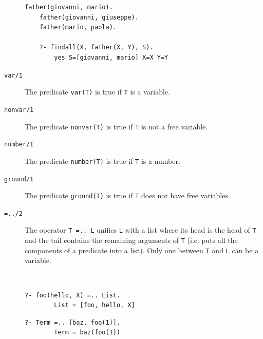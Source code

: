 \begin{description}
        \begin{example} \phantom{}
                \begin{lstlisting}[language={}]
    father(giovanni, mario).
    father(giovanni, giuseppe).
    father(mario, paola).

    ?- findall(X, father(X, Y), S).
        yes S=[giovanni, mario] X=X Y=Y
                \end{lstlisting}   
        \end{example}

    \item[\texttt{var/1}] 
        The predicate \texttt{var(T)} is true if \texttt{T} is a variable.    

    \item[\texttt{nonvar/1}] 
        The predicate \texttt{nonvar(T)} is true if \texttt{T} is not a free variable.    

    \item[\texttt{number/1}] 
        The predicate \texttt{number(T)} is true if \texttt{T} is a number.    

    \item[\texttt{ground/1}] 
        The predicate \texttt{ground(T)} is true if \texttt{T} does not have free variables.    

    \item[\texttt{=../2}] 
        The operator \texttt{T =.. L} unifies \texttt{L} with a list where 
        its head is the head of \texttt{T} and the tail contains the remaining arguments of \texttt{T}
        (i.e. puts all the components of a predicate into a list).
        Only one between \texttt{T} and \texttt{L} can be a variable.

        \begin{example} \phantom{} \\
            \begin{minipage}{0.5\textwidth}
                \begin{lstlisting}[language={}]
    ?- foo(hello, X) =.. List.
        List = [foo, hello, X]
                \end{lstlisting}   
            \end{minipage}
            \begin{minipage}{0.5\textwidth}
                \begin{lstlisting}[language={}]
    ?- Term =.. [baz, foo(1)].
        Term = baz(foo(1))
                \end{lstlisting} 
            \end{minipage}
        \end{example}


\end{description}
